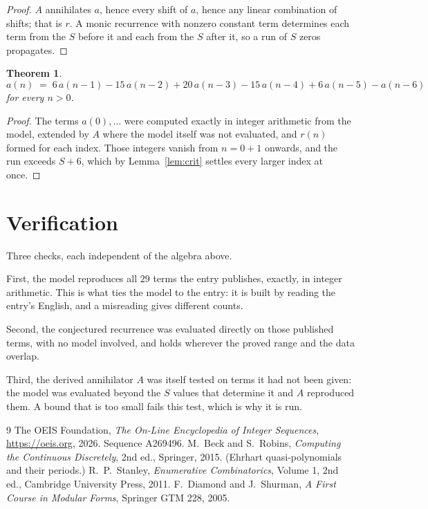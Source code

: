 \documentclass[11pt,a4paper]{article}
\theoremstyle{plain}
\newtheorem{theorem}{Theorem}
\theoremstyle{definition}
\begin{document}
\begin{proof}
$A$ annihilates $a$, hence every shift of $a$, hence any linear combination of shifts; that is
$r$. A monic recurrence with nonzero constant term determines each term from the $S$ before it
and each from the $S$ after it, so a run of $S$ zeros propagates.
\end{proof}

\begin{theorem}
\[
a(n)\;=\;6\,a(n-1) - 15\,a(n-2) + 20\,a(n-3) - 15\,a(n-4) + 6\,a(n-5) - a(n-6)
\]
for every $n>0$.
\end{theorem}

\begin{proof}
The terms $a(0),\dots$ were computed exactly in integer arithmetic from the model, extended by
$A$ where the model itself was not evaluated, and $r(n)$ formed for each index. Those integers
vanish from $n=0+1$ onwards, and the run exceeds $S+6$, which by
Lemma~\ref{lem:crit} settles every larger index at once.
\end{proof}

\section{Verification}

Three checks, each independent of the algebra above.

First, the model reproduces all $29$ terms the entry publishes, exactly, in integer
arithmetic. This is what ties the model to the entry: it is built by reading the entry's
English, and a misreading gives different counts.

Second, the conjectured recurrence was evaluated directly on those published terms, with no
model involved, and holds wherever the proved range and the data overlap.

Third, the derived annihilator $A$ was itself tested on terms it had not been given: the model
was evaluated beyond the $S$ values that determine it and $A$ reproduced them. A bound that is
too small fails this test, which is why it is run.

\begin{thebibliography}{9}
 The OEIS Foundation, \emph{The On-Line Encyclopedia of Integer
Sequences}, \url{https://oeis.org}, 2026. Sequence A269496.
 M.~Beck and S.~Robins, \emph{Computing the Continuous Discretely},
2nd ed., Springer, 2015. (Ehrhart quasi-polynomials and their periods.)
 R.~P.~Stanley, \emph{Enumerative Combinatorics}, Volume 1, 2nd ed.,
Cambridge University Press, 2011.
 F.~Diamond and J.~Shurman, \emph{A First Course in Modular Forms},
Springer GTM 228, 2005.
\end{thebibliography}
\end{document}
